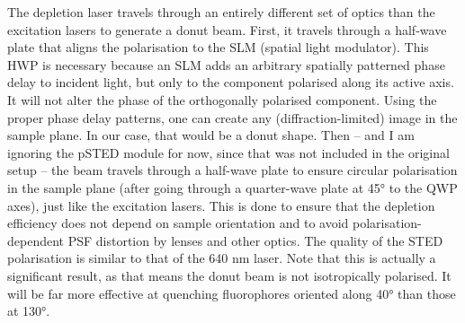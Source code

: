 The depletion laser travels through an entirely different set of optics than the excitation lasers to generate a donut beam. First, it travels through a half-wave plate that aligns the polarisation to the SLM (spatial light modulator). This HWP is necessary because an SLM adds an arbitrary spatially patterned phase delay to incident light, but only to the component polarised along its active axis. It will not alter the phase of the orthogonally polarised component. Using the proper phase delay patterns, one can create any (diffraction-limited) image in the sample plane. In our case, that would be a donut shape. Then -- and I am ignoring the pSTED module for now, since that was not included in the original setup -- the beam travels through a half-wave plate to ensure circular polarisation in the sample plane (after going through a quarter-wave plate at \ang{45} to the QWP axes), just like the excitation lasers. This is done to ensure that the depletion efficiency does not depend on sample orientation and to avoid polarisation-dependent PSF distortion by lenses and other optics. The quality of the STED polarisation is similar to that of the 640 nm laser. Note that this is actually a significant result, as that means the donut beam is not isotropically polarised. It will be far more effective at quenching fluorophores oriented along \ang{40} than those at \ang{130}.

